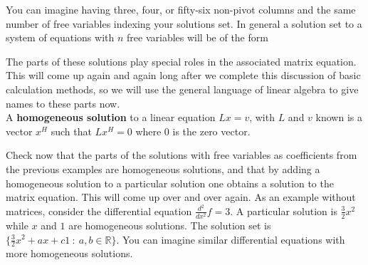 

\begin{center}
{}
\end{center}

You can imagine having three, four, or fifty-six non-pivot columns and the same number of free variables indexing your solutions set. 
In general a solution set to a system of equations with $n$ free variables will be of the form 
\begin{center}
\end{center}

The parts of these solutions play special roles in the associated matrix equation. This will come up again and again long after we complete this discussion of basic calculation methods, so we will use the general language of linear algebra to give names to these parts now. \\

 A {\bfseries homogeneous solution} to a linear equation $Lx=v$, with $L$ and $v$ known is a vector $x^H $ such  that $Lx^H =0$ where $0$ is the zero vector. \\




\begin{center}
\end{center}



Check now that the parts of the solutions with free variables as coefficients from the previous examples are homogeneous solutions, and that by adding a homogeneous solution to a particular solution one obtains a solution to the matrix equation. This will come up over and over again. As an example without matrices, consider the differential equation $\frac{d^2}{dx^2} f=3$. A particular solution is $\frac32x^2$ while $x$ and $1$ are homogeneous solutions. The solution set is $\{ \frac32 x^2+ax +c1 ~:~a,b\in\mathbb{R} \}$. You can imagine similar differential equations with more homogeneous solutions. \\


